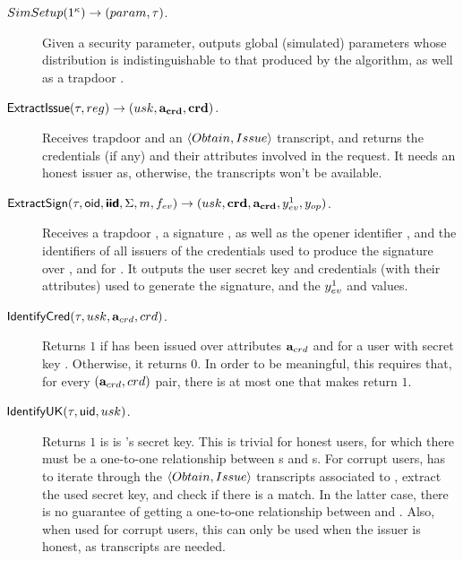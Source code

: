 \begin{description}
\item[$SimSetup(1^\kappa) \rightarrow (param,\tau)$.] Given a security
  parameter, outputs global (simulated) parameters \parm whose distribution is
  indistinguishable to that produced by the \Setup algorithm, as well as a
  trapdoor \trap.
\item[$\mathsf{ExtractIssue}(\tau,reg) \rightarrow (usk,\mathbf{a}_{\mathbf{crd}},\mathbf{crd})$.]
  Receives trapdoor \trap and an $\langle Obtain, Issue \rangle$ transcript,
  and returns the credentials (if any) and their attributes involved in the
  request. It needs an honest issuer as, otherwise, the transcripts won't be
  available. 
\item[$\mathsf{ExtractSign}(\tau,\mathsf{oid},\boldsymbol{\mathsf{\mathsf{iid}}},\Sigma,m,f_{ev}) \rightarrow (usk,
  \mathbf{crd},\mathbf{a}_{\mathbf{crd}},y_{ev}^1,y_{op})$.] Receives a trapdoor \trap, a
  signature \Sig,
  as well as the opener identifier \oid, and the identifiers of all issuers of
  the credentials used to produce the signature over \msg, and for \feval.
  It outputs the user secret key and credentials (with their attributes) used to
  generate the signature, and the $y_{ev}^1$ and \yinsp values.
\item[$\mathsf{IdentifyCred}(\tau,usk,\mathbf{a}_{crd},crd)$.] Returns $1$ if \cred has been
  issued over attributes $\mathbf{a}_{crd}$ and for a user with secret key \usk.
  Otherwise, it returns $0$. In order to be meaningful, this requires that,
  for every $(\mathbf{a}_{crd},crd)$ pair, there is at most one \usk that makes
  \IdentifyCred return $1$.
\item[$\mathsf{IdentifyUK}(\tau,\mathsf{uid},usk)$.] Returns $1$ is \usk is {\uid}'s secret
  key. This is trivial for honest users, for which there must be a one-to-one
  relationship between {\uid}s and {\usk}s. For corrupt users, \IdentifyUK has
  to iterate through the $\langle Obtain,Issue\rangle$ transcripts associated
  to \uid, extract the used secret key, and check if there is a match. In the
  latter case, there is no guarantee of getting a one-to-one relationship
  between \usk and \uid. Also, when used for corrupt users, this can only be
  used when the issuer is honest, as transcripts are needed. 
\end{description}


